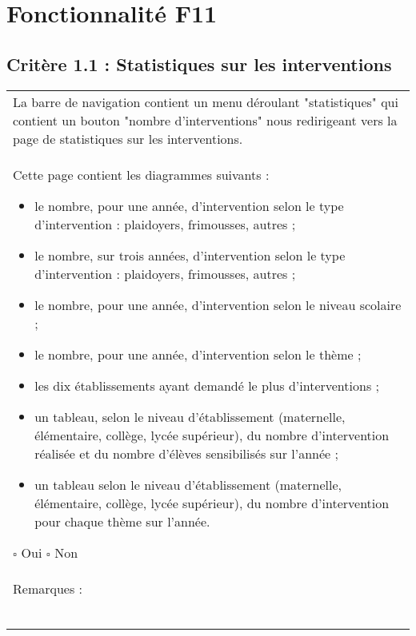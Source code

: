 
\section{Fonctionnalité F11}

	\subsection*{Critère 1.1 : Statistiques sur les interventions}
	
		\begin{center}
    	 		\begin{tabular}[h]{|p{}|}
			\hline
				La barre de navigation contient un menu déroulant "statistiques" qui contient un bouton "nombre d'interventions" nous redirigeant vers la page de statistiques sur les interventions.\\
Cette page contient les diagrammes suivants :
		\begin{itemize}
			\item le nombre, pour une année, d'intervention selon le type d’intervention : plaidoyers, frimousses, autres ;
			\item le nombre, sur trois années, d'intervention selon le type d’intervention : plaidoyers, frimousses, autres ;
			\item le nombre, pour une année, d'intervention selon le niveau scolaire ;
			\item le nombre, pour une année, d'intervention selon le thème ;
			\item les dix établissements ayant demandé le plus d'interventions ;
			\item un tableau, selon le niveau d’établissement (maternelle, élémentaire, collège, lycée supérieur), du nombre d'intervention réalisée et du nombre d’élèves sensibilisés sur l'année ;
			\item un tableau selon le niveau d’établissement (maternelle, élémentaire, collège, lycée supérieur), du nombre d'intervention pour chaque thème sur l'année.
			
		\end{itemize}
				
				$\square$ Oui \hfill \hfill $\square$ Non \\\hline Remarques : \\ ~\\
			 \\\hline
     		\end{tabular}
  		\end{center}	

